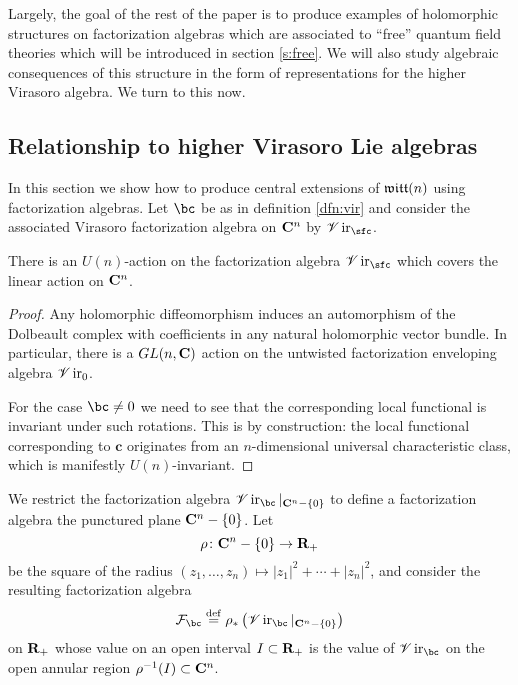 \documentclass[11pt]{amsart}
\newcommand{\Vir}{\sV\op{ir}}
\renewcommand{\op}{\operatorname}
\begin{document}
Largely, the goal of the rest of the paper is to produce examples of holomorphic structures on factorization algebras which are associated to ``free'' quantum field theories which will be introduced in section \ref{s:free}.
We will also study algebraic consequences of this structure in the form of representations for the higher Virasoro algebra.
We turn to this now.

\subsection{Relationship to higher Virasoro Lie algebras}

In this section we show how to produce central extensions of $\mathfrak{witt}(n)$ using factorization algebras.
Let $\bc$ be as in definition \ref{dfn:vir} and consider the associated Virasoro factorization algebra on $\mathbf{C}^n$ by $\Vir_{\sfc}$.

\begin{lem}
There is an $U(n)$-action on the factorization algebra $\Vir_{\sfc}$ which covers the linear action on $\mathbf{C}^n$.
\end{lem}
\begin{proof}
Any holomorphic diffeomorphism induces an automorphism of the Dolbeault complex with coefficients in any natural holomorphic vector bundle.
In particular, there is a $GL(n,\mathbf{C})$ action on the untwisted factorization enveloping algebra $\Vir_{0}$.

For the case $\bc \ne 0$ we need to see that the corresponding local functional is invariant under such rotations.
This is by construction: the local functional corresponding to $\mathbf{c}$ originates from an $n$-dimensional universal characteristic class, which is manifestly $U(n)$-invariant.
\end{proof}

We restrict the factorization algebra $\Vir_{\bc} |_{\C^n - \{0\}}$ to define a factorization algebra the punctured plane $\mathbf{C}^n - \{0\}$.
Let 
\begin{equation}
\rho \colon \mathbf{C}^n - \{0\} \to \mathbf{R}_+
\end{equation}
be the square of the radius $(z_1,\ldots,z_n) \mapsto |z_1|^2 + \cdots + |z_n|^2$, and consider the resulting factorization algebra 
\begin{equation}
\cF_{\bc} \define \rho_* \left(\Vir_{\bc} |_{\C^n - \{0\}}\right)
\end{equation}
on $\mathbf{R}_+$ whose value on an open interval $I \subset \mathbf{R}_+$ is the value of $\Vir_{\bc}$ on the open annular region $\rho^{-1}(I) \subset \mathbf{C}^n$.
\end{document}
